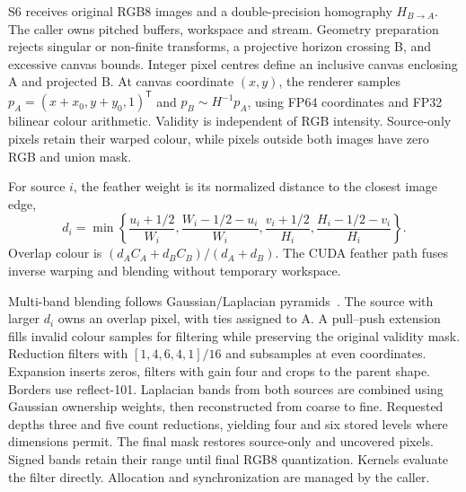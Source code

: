 S6 receives original RGB8 images and a double-precision homography
$H_{B\rightarrow A}$. The caller owns pitched buffers, workspace and stream.
Geometry preparation rejects singular or non-finite transforms, a projective
horizon crossing B, and excessive canvas bounds. Integer pixel centres define
an inclusive canvas enclosing A and projected B. At canvas coordinate $(x,y)$,
the renderer samples $p_A=(x+x_0,y+y_0,1)^{\mathsf T}$ and
$p_B\sim H^{-1}p_A$, using FP64 coordinates and FP32 bilinear colour arithmetic.
Validity is independent of RGB intensity. Source-only pixels retain their
warped colour, while pixels outside both images have zero RGB and union mask.

For source $i$, the feather weight is its normalized distance to the closest
image edge,
\begin{equation}
d_i=\min\!\left\{\frac{u_i+1/2}{W_i},\frac{W_i-1/2-u_i}{W_i},
                 \frac{v_i+1/2}{H_i},\frac{H_i-1/2-v_i}{H_i}\right\}.
\end{equation}
Overlap colour is $(d_A C_A+d_B C_B)/(d_A+d_B)$. The CUDA feather path
fuses inverse warping and blending without temporary workspace.

Multi-band blending follows Gaussian/Laplacian pyramids~\cite{burt1983spline}.
The source with larger $d_i$ owns an overlap pixel, with ties assigned to A.
A pull--push extension fills invalid colour samples for filtering while
preserving the original validity mask. Reduction filters with
$[1,4,6,4,1]/16$ and subsamples at even coordinates. Expansion inserts zeros,
filters with gain four and crops to the parent shape. Borders use reflect-101.
Laplacian bands from both sources are combined using Gaussian ownership
weights, then reconstructed from coarse to fine. Requested depths three and
five count reductions, yielding four and six stored levels where dimensions
permit. The final mask restores source-only and uncovered pixels. Signed bands
retain their range until final RGB8 quantization. Kernels evaluate the filter
directly. Allocation and synchronization are managed by the caller.
